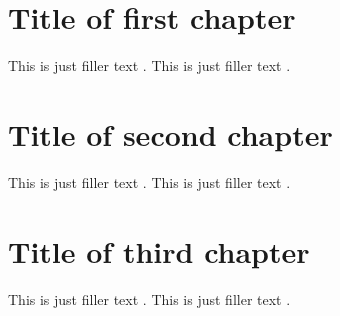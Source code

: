 \documentclass[a4paper,oneside]{book}
\begin{document}
\chapter{Title of first chapter}
\begin{refsegment}
This is just filler text \parencite{westfahl:space}.
This is just filler text \parencite{nietzsche:ksa}.
\end{refsegment}

\chapter{Title of second chapter}
\begin{refsegment}
This is just filler text \parencite{nietzsche:historie}.
This is just filler text \parencite{westfahl:frontier}.
\end{refsegment}

\chapter{Title of third chapter}
\begin{refsegment}
This is just filler text \parencite{aristotle:anima}.
This is just filler text \parencite{averroes/bland}.
\end{refsegment}

\printbibheading
\bibbysegment[heading=subbibliography]
%
%
\end{document}
